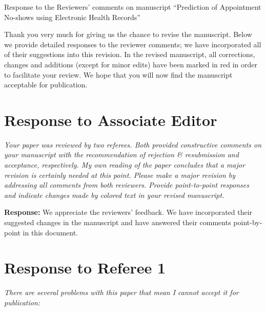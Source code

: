 \documentclass[11pt,a4paper,oneside]{article}
\begin{document}
{\Large \bf \begin{center} 
Response to the Reviewers' comments on manuscript ``Prediction of Appointment No-shows using Electronic Health Records''
\end{center}}


Thank you very much for giving us the chance to revise the manuscript. Below we provide detailed responses to the reviewer comments; we have incorporated all of their suggestions into this revision. In the revised manuscript, all corrections, changes and additions (except for minor edits) have been marked in red in order to facilitate your review. We hope that you will now find the manuscript acceptable for publication.


\section*{ Response to Associate Editor}

{\em Your paper was reviewed by two referees.  Both provided constructive comments on your manuscript with the recommendation of rejection \& resubmission and acceptance, respectively. My own reading of the paper concludes that a major revision is certainly needed at this point. Please make a major revision by addressing all comments from both reviewers. Provide point-to-point responses and indicate changes made by colored text in your revised manuscript.}

\vspace{12pt}
{\bf Response:}  We appreciate the reviewers' feedback. We have incorporated their suggested changes in the manuscript and have answered their comments point-by-point in this document.    


\section*{Response to Referee 1}

{\em There are several problems with this paper that mean I cannot accept it for publication:}
\end{document}
